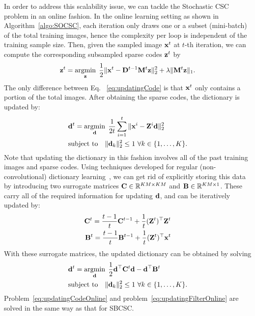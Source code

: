 In order to address this scalability issue, we can tackle the
Stochastic CSC problem in an online fashion. In the online learning
setting as shown in Algorithm~\ref{algo:SOCSC}, each iteration only
draws one or a subset (mini-batch) of the total training images, hence
the complexity per loop is independent of the training sample
size. Then, given the sampled image $\signal^t$ at $t$-th iteration,
we can compute the corresponding subsampled sparse codes $\code^t$ by
\begin{equation} \label{eq:updatingCodeOnline}
    \code^t = \minimize{\code} \frac{1}{2}\|\signal^t - \Filter^{t-1}\mask^t \code \|_2^2 + \lambda \|\mask^t \code\|_1.
\end{equation}
The only difference between Eq. ~\ref{eq:updatingCode} is that $\signal^t$ only contains a portion of the total images. After obtaining
the sparse codes, the dictionary is updated by:
\begin{equation}
\begin{split}
    &\filter^t = \minimize{\filter} \frac{1}{2t}\sum_{i=1}^{t} \|\signal^i - \Code^i \filter \|_2^2 \\
    &\text{subject to} \quad \|\filter_k\|^2_2 \leq 1 ~ \forall k \in \{1,\dots,K\}.
\end{split}
\end{equation}
Note that updating the dictionary in this fashion involves all of the
past training images and sparse codes. Using techniques developed for
regular (non-convolutional) dictionary
learning~\cite{mairal2009online,mairal2010online}, we can get rid of
explicitly storing this data by introducing two surrogate matrices
$\surC \in \mathbb{R}^{KM \times KM}$ and $\surB \in \mathbb{R}^{KM
  \times 1}$. These carry all of the required information for updating
$\filter$, and can be iteratively updated by:
\begin{equation} \label{eq:updateSur}
\begin{split}
    \surC^t  = \frac{t-1}{t} \surC^{t-1} + \frac{1}{t}(\Code^t)^\top \Code^t \\
    \surB^t  = \frac{t-1}{t} \surB^{t-1} + \frac{1}{t}(\Code^t)^\top \signal^t
\end{split}
\end{equation}
With these surrogate matrices, the updated dictionary can be obtained
by solving
\begin{equation} \label{eq:updatingFilterOnline}
\begin{split}
    & \filter^t = \minimize{\filter} \frac{1}{2} \filter^\top \surC^t\filter - \filter^\top \surB^t \\& \text{subject to} \quad \|\filter_k\|_2^2 \leq 1 ~ \forall k \in \{1,\dots,K\}.
\end{split}
\end{equation}
Problem~\eqref{eq:updatingCodeOnline} and
problem~\eqref{eq:updatingFilterOnline} are solved in the same way as
that for SBCSC.

